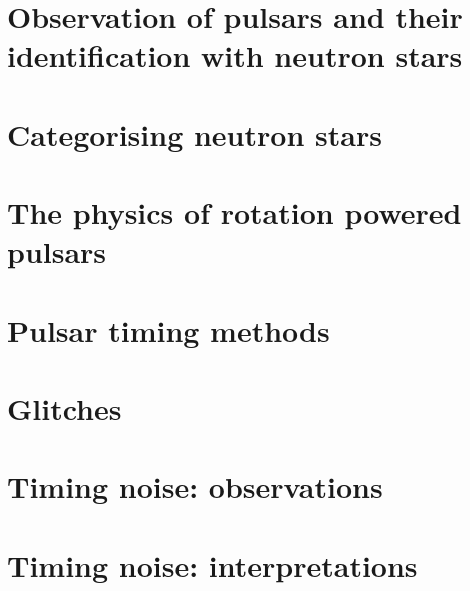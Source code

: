\documentclass[../full_thesis/full_thesis.tex]{subfiles}
\newcommand{\thisdir}{../introduction}
\begin{document}
 



\section{Observation of pulsars and their identification with neutron stars}


\section{Categorising neutron stars}


\section{The physics of rotation powered pulsars} 
\label{sec: rotation powered pulsars}


\FloatBarrier
%

\section{Pulsar timing methods}
\label{sec: pulsar timing methods}


\section{Glitches}
\label{ref: glitches}


\section{Timing noise: observations}
\label{sec: timing noise observations}


\section{Timing noise: interpretations}
\label{sec: timing noise interpretations}


\biblio
\end{document}
